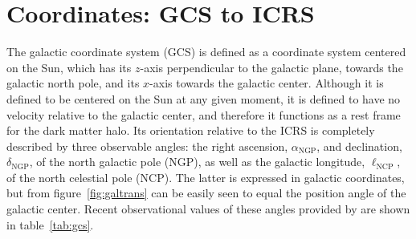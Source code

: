 \section{Coordinates: GCS to ICRS}

The galactic coordinate system (GCS) is defined as a coordinate system centered on the Sun, which has its $z$-axis perpendicular to the galactic plane, towards the galactic north pole, and its $x$-axis towards the galactic center. Although it is defined to be centered on the Sun at any given moment, it is defined to have no velocity relative to the galactic center, and therefore it functions as a rest frame for the dark matter halo. Its orientation relative to the ICRS is completely described by three observable angles: the right ascension, $\alpha_\text{NGP}$, and declination, $\delta_\text{NGP}$, of the north galactic pole (NGP), as well as the galactic longitude, $\ell_\text{NCP}$, of the north celestial pole (NCP). The latter is expressed in galactic coordinates, but from figure~\ref{fig:galtrans} can be easily seen to equal the position angle of the galactic center. Recent observational values of these angles provided by \cite{KarimMamajek2017} are shown in table~\ref{tab:gcs}.


